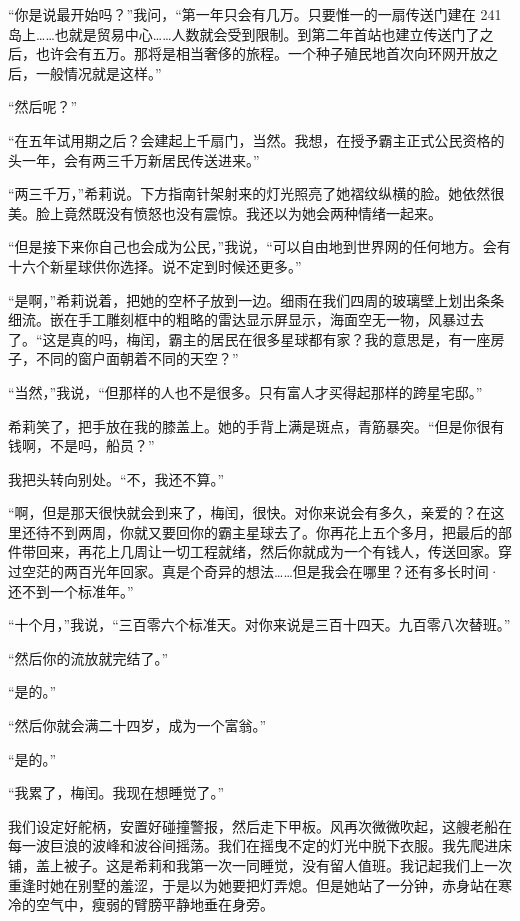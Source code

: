 \documentclass[AutoFakeBold=true]{book}
\begin{document}
``你是说最开始吗？''我问，``第一年只会有几万。只要惟一的一扇传送门建在 241 岛上……也就是贸易中心……人数就会受到限制。到第二年首站也建立传送门了之后，也许会有五万。那将是相当奢侈的旅程。一个种子殖民地首次向环网开放之后，一般情况就是这样。''

``然后呢？''

``在五年试用期之后？会建起上千扇门，当然。我想，在授予霸主正式公民资格的头一年，会有两三千万新居民传送进来。''

``两三千万，''希莉说。下方指南针架射来的灯光照亮了她褶纹纵横的脸。她依然很美。脸上竟然既没有愤怒也没有震惊。我还以为她会两种情绪一起来。

``但是接下来你自己也会成为公民，''我说，``可以自由地到世界网的任何地方。会有十六个新星球供你选择。说不定到时候还更多。''

``是啊，''希莉说着，把她的空杯子放到一边。细雨在我们四周的玻璃壁上划出条条细流。嵌在手工雕刻框中的粗略的雷达显示屏显示，海面空无一物，风暴过去了。``这是真的吗，梅闰，霸主的居民在很多星球都有家？我的意思是，有一座房子，不同的窗户面朝着不同的天空？''

``当然，''我说，``但那样的人也不是很多。只有富人才买得起那样的跨星宅邸。''

希莉笑了，把手放在我的膝盖上。她的手背上满是斑点，青筋暴突。``但是你很有钱啊，不是吗，船员？''

我把头转向别处。``不，我还不算。''

``啊，但是那天很快就会到来了，梅闰，很快。对你来说会有多久，亲爱的？在这里还待不到两周，你就又要回你的霸主星球去了。你再花上五个多月，把最后的部件带回来，再花上几周让一切工程就绪，然后你就成为一个有钱人，传送回家。穿过空茫的两百光年回家。真是个奇异的想法……但是我会在哪里？还有多长时间·还不到一个标准年。''

``十个月，''我说，``三百零六个标准天。对你来说是三百十四天。九百零八次替班。''

``然后你的流放就完结了。''

``是的。''

``然后你就会满二十四岁，成为一个富翁。''

``是的。''

``我累了，梅闰。我现在想睡觉了。''

我们设定好舵柄，安置好碰撞警报，然后走下甲板。风再次微微吹起，这艘老船在每一波巨浪的波峰和波谷间摇荡。我们在摇曳不定的灯光中脱下衣服。我先爬进床铺，盖上被子。这是希莉和我第一次一同睡觉，没有留人值班。我记起我们上一次重逢时她在别墅的羞涩，于是以为她要把灯弄熄。但是她站了一分钟，赤身站在寒冷的空气中，瘦弱的臂膀平静地垂在身旁。
\end{document}
